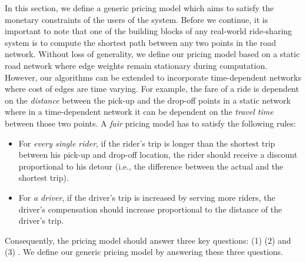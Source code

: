 In this section, we define a generic pricing model which aims to satisfy the monetary constraints of the users of the system. Before we continue, it is important to note that one of the building blocks of any real-world ride-sharing system is to compute the shortest path between any two points in the road network. Without loss of generality, we define our pricing model based on a static road network where edge weights remain stationary during computation. However, our algorithms can be extended to incorporate time-dependent networks where cost of edges are time varying. For example, the fare of a ride is dependent on the \textit{distance} between the pick-up and the drop-off points in a static network where in a time-dependent network it can be dependent on the \textit{travel time} between those two points. A \textit{fair} pricing model has to satisfy the following rules:
\vspace{-2mm}
\begin{itemize}
\item For \textit{every single rider}, if the rider's trip is longer than the shortest trip between his pick-up and drop-off location, the rider should receive a discount proportional to his detour (i.e., the difference between the actual and the shortest trip).
\vspace{-2mm}
\item For \textit{a driver}, if the driver's trip is increased by serving more riders, the driver's compensation should increase proportional to the distance of the driver's trip.
\end{itemize}

Consequently, the pricing model should answer three key questions: (1)  (2)  and (3) . We define our generic pricing model by answering these three questions.

